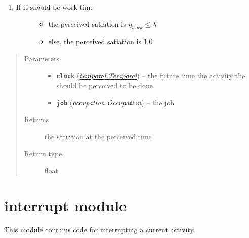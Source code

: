 \documentclass[letterpaper,10pt,english]{sphinxmanual}
\begin{document}
\begin{fulllineitems}
\begin{fulllineitems}
\begin{enumerate}
\item {} \begin{description}
\item[{If it should be work time}] \leavevmode\begin{itemize}
\item {} 
the perceived satiation is \(\eta_{work} \le \lambda\)

\item {} 
else, the perceived satiation is \(1.0\)

\end{itemize}

\end{description}

\end{enumerate}
\begin{quote}\begin{description}
\item[{Parameters}] \leavevmode\begin{itemize}
\item {} 
\textbf{\texttt{clock}} ({\hyperref[temporal:temporal.Temporal]{\emph{\emph{temporal.Temporal}}}}) -- the future time the activity the should be perceived to be done

\item {} 
\textbf{\texttt{job}} ({\hyperref[occupation:occupation.Occupation]{\emph{\emph{occupation.Occupation}}}}) -- the job

\end{itemize}

\item[{Returns}] \leavevmode
the satiation at the perceived time

\item[{Return type}] \leavevmode
float

\end{description}\end{quote}

\end{fulllineitems}


\end{fulllineitems}



\section{interrupt module}
\label{interrupt::doc}\label{interrupt:module-interrupt}\label{interrupt:interrupt-module}
This module contains code for interrupting a current activity.
\end{document}
